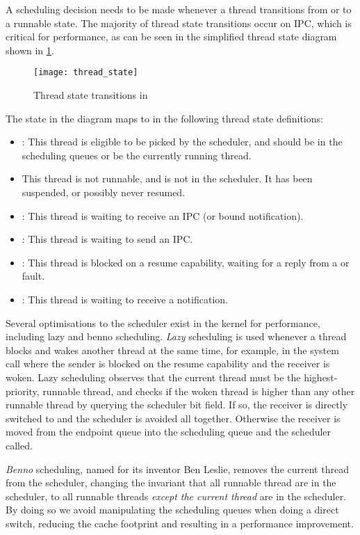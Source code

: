 A scheduling decision needs to be made whenever a thread transitions from or to a runnable state.
The majority of thread state transitions occur on IPC, which is critical for performance, 
as can be seen in the simplified thread state diagram shown in \cref{f:thread_state}. 
\begin{figure}[h!tb]
    \centering
    \texttt{[image: thread\_state]}
    \caption{Thread state transitions in \selfour}
    \label{f:thread_state}
\end{figure}
The  state in the diagram maps to  in the following thread
state definitions:
\begin{itemize}
    \item {}: This thread is eligible to be picked by the scheduler, and should be in the
        scheduling queues or be the currently running thread.
    \item {} This thread is not runnable, and is not in the scheduler. It has been
        suspended, or possibly never resumed. 
    \item {}: This thread is waiting to receive an IPC (or bound notification). 
    \item {}: This thread is waiting to send an IPC. 
    \item {}: This thread is blocked on a resume capability, waiting for a reply
        from a  or fault.
    \item {}: This thread is waiting to receive a notification.
\end{itemize}

Several optimisations to the scheduler exist in the kernel for performance, including lazy and benno
scheduling. 
\emph{Lazy} scheduling is used whenever a thread blocks and wakes
another thread at the same time, for example, in the  system call where the sender is
blocked on the resume capability and the receiver is woken. Lazy scheduling observes that the
current thread must be the highest-priority, runnable thread, and checks if the woken thread is
higher than any other runnable thread by querying the scheduler bit field. If so, the receiver is
directly switched to and the scheduler is avoided all together. Otherwise the receiver is moved from
the endpoint queue into the scheduling queue and the scheduler called.

\emph{Benno} scheduling, named for its inventor Ben Leslie, removes the current thread from the 
scheduler, changing the invariant that all runnable thread are in the scheduler, to all runnable
threads \emph{except the current thread} are in the scheduler. By doing so we avoid manipulating the
scheduling queues when doing a direct switch, reducing the cache footprint and resulting in a performance improvement.

